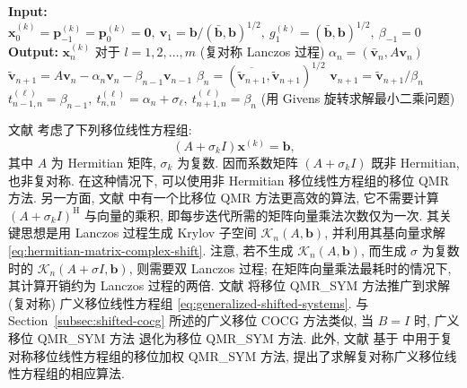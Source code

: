 \begin{algorithm}[H]\caption{{移位 QMR\_SYM 方法 (注意: $(\bar{\bm a},\bm b)=\bm a^{\top}\bm b$)}}\label{alg:shifted-qmr-sym}\begin{algorithmic}[1]
\Statex\textbf{Input:} $\bm x_0^{(k)}=\bm p_{-1}^{(k)}=\bm p_0^{(k)}=\bm0,\ \bm v_1=\bm b/(\bar{\bm b},\bm b)^{1/2},\ g_1^{(k)}=(\bar{\bm b},\bm b)^{1/2},\ \beta_{-1}=0$
\Statex\textbf{Output:} $\bm x_n^{(k)}$ {对于} $l=1,2,\ldots,m$
\State ({复对称 Lanczos 过程})
\State $\alpha_n=(\bar{\bm v}_n,A\bm v_n)$
\State $\widetilde{\bm v}_{n+1}=A\bm v_n-\alpha_n\bm v_n-\beta_{n-1}\bm v_{n-1}$
\State $\beta_n=(\overline{\widetilde{\bm v}_{n+1}},\widetilde{\bm v}_{n+1})^{1/2}$
\State $\bm v_{n+1}=\widetilde{\bm v}_{n+1}/\beta_n$
\State $t_{n-1,n}^{(\ell)}=\beta_{n-1},\ t_{n,n}^{(\ell)}=\alpha_n+\sigma_{\ell},\ t_{n+1,n}^{(\ell)}=\beta_n$
\State ({用 Givens 旋转求解最小二乘问题})
\EndFor\end{algorithmic}\end{algorithm}
{文献  考虑了下列移位线性方程组:}
\begin{equation}\label{eq:hermitian-matrix-complex-shift}(A+\sigma_k I)\bm x^{(k)}=\bm b,\end{equation}
{其中 $A$ 为 Hermitian 矩阵, $\sigma_k$ 为复数. 因而系数矩阵 $(A+\sigma_k I)$ 既非 Hermitian, 也非复对称. 在这种情况下, 可以使用非 Hermitian 移位线性方程组的移位 QMR 方法. 另一方面, 文献  中有一个比移位 QMR 方法更高效的算法, 它不需要计算 $(A+\sigma_k I)^{\mathrm H}$ 与向量的乘积, 即每步迭代所需的矩阵向量乘法次数仅为一次. 其关键思想是用 Lanczos 过程生成 Krylov 子空间 $\mathcal K_n(A,\bm b)$, 并利用其基向量求解 \eqref{eq:hermitian-matrix-complex-shift}. 注意, 若不生成 $\mathcal K_n(A,\bm b)$, 而生成 $\sigma$ 为复数时的 $\mathcal K_n(A+\sigma I,\bm b)$, 则需要双 Lanczos 过程; 在矩阵向量乘法最耗时的情况下, 其计算开销约为 Lanczos 过程的两倍.}
{文献  将移位 QMR\_SYM 方法推广到求解 (复对称) 广义移位线性方程组 \eqref{eq:generalized-shifted-systems}. 与 Section\ \ref{subsec:shifted-cocg} 所述的广义移位 COCG 方法类似, 当 $B=I$ 时, 广义移位 QMR\_SYM 方法  退化为移位 QMR\_SYM 方法. 此外, 文献  基于  中用于复对称移位线性方程组的移位加权 QMR\_SYM 方法, 提出了求解复对称广义移位线性方程组的相应算法.}
